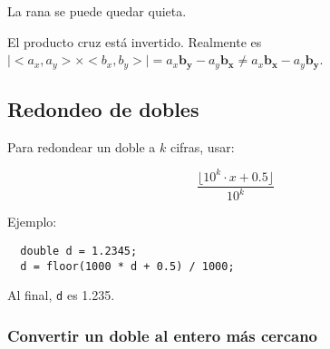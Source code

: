 \documentclass[10pt,letterpaper,twocolumn,twosided]{article}
\begin{document}
\begin{itemize}
  \begin{item}
    La rana se puede quedar quieta.
  \end{item}
  
  \begin{item}
    El producto cruz está invertido. Realmente es $\mid<a_x, a_y> \times <b_x, b_y>\mid = a_x \mathbf{b_y} - a_y \mathbf{b_x} \neq a_x \mathbf{b_x} - a_y \mathbf{b_y} $.
  \end{item}
\end{itemize}

\subsection{Redondeo de dobles}

Para redondear un doble a $k$ cifras, usar:

$$ \frac{\lfloor 10^{k} \cdot x + 0.5 \rfloor }{10^k} $$

Ejemplo:

\begin{verbatim}
  double d = 1.2345;
  d = floor(1000 * d + 0.5) / 1000;
\end{verbatim}

Al final, \verb_d_ es 1.235.

\subsubsection{Convertir un doble al entero más cercano}
\end{document}

